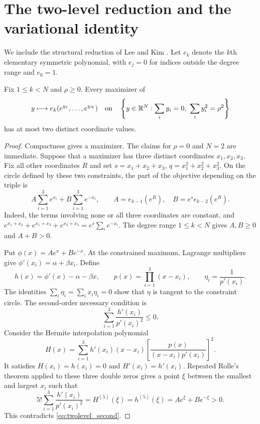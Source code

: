 \section{The two-level reduction and the variational identity}\label{sec:exchangeable}
We include the structural reduction of Lee and Kim \cite[Proposition 2 and Remark 1]{LeeKim}. Let $e_k$ denote the $k$th elementary symmetric polynomial, with $e_j=0$ for indices outside the degree range and $e_0=1$.

\begin{proposition}\label{prop:two_level}
Fix $1\le k<N$ and $\rho\ge0$. Every maximizer of
\[
 y\longmapsto e_k(e^{y_1},\ldots,e^{y_N})
 \quad\text{on}\quad
 \left\{y\in\mathbb R^N:\sum_i y_i=0,\ \sum_i y_i^2=\rho^2\right\}
\]
has at most two distinct coordinate values.
\end{proposition}
\begin{proof}
Compactness gives a maximizer. The claims for $\rho=0$ and $N=2$ are immediate. Suppose that a maximizer has three distinct coordinates $x_1,x_2,x_3$. Fix all other coordinates $R$ and set $s=x_1+x_2+x_3$, $q=x_1^2+x_2^2+x_3^2$. On the circle defined by these two constraints, the part of the objective depending on the triple is
\[
 A\sum_{i=1}^3e^{x_i}+B\sum_{i=1}^3e^{-x_i},
 \qquad A=e_{k-1}(e^R),\quad B=e^s e_{k-2}(e^R).
\]
Indeed, the terms involving none or all three coordinates are constant, and $e^{x_1+x_2}+e^{x_1+x_3}+e^{x_2+x_3}=e^s\sum_i e^{-x_i}$. The degree range $1\le k<N$ gives $A,B\ge0$ and $A+B>0$.

Put $\phi(x)=Ae^x+Be^{-x}$. At the constrained maximum, Lagrange multipliers give $\phi'(x_i)=\alpha+\beta x_i$. Define
\[
 h(x)=\phi'(x)-\alpha-\beta x,\qquad p(x)=\prod_{i=1}^3(x-x_i),\qquad
 \eta_i=\frac1{p'(x_i)}.
\]
The identities $\sum_i\eta_i=\sum_i x_i\eta_i=0$ show that $\eta$ is tangent to the constraint circle. The second-order necessary condition is
\begin{equation}\label{eq:twolevel_second}
 \sum_{i=1}^3\frac{h'(x_i)}{p'(x_i)^2}\le0.
\end{equation}
Consider the Hermite interpolation polynomial
\[
 H(x)=\sum_{i=1}^3h'(x_i)(x-x_i)
 \left[\frac{p(x)}{(x-x_i)p'(x_i)}\right]^2.
\]
It satisfies $H(x_i)=h(x_i)=0$ and $H'(x_i)=h'(x_i)$. Repeated Rolle's theorem applied to these three double zeros gives a point $\xi$ between the smallest and largest $x_i$ such that
\[
 5!\sum_{i=1}^3\frac{h'(x_i)}{p'(x_i)^2}
 =H^{(5)}(\xi)=h^{(5)}(\xi)=Ae^\xi+Be^{-\xi}>0.
\]
This contradicts \eqref{eq:twolevel_second}.
\end{proof}

